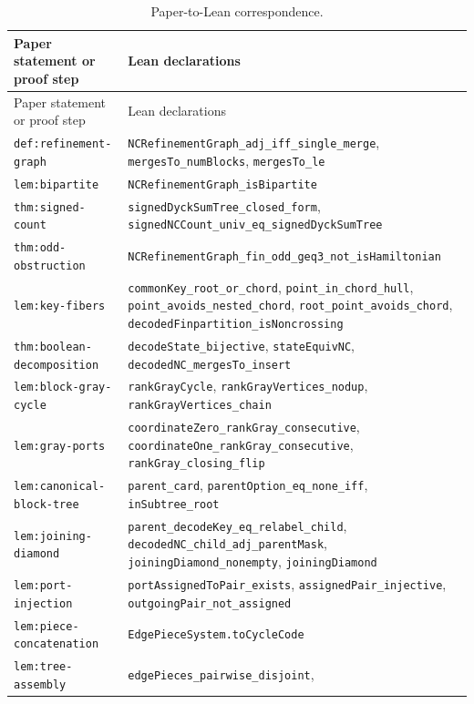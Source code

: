 \documentclass[12pt]{article}
\newcommand{\leanname}[1]{\nolinkurl{#1}}
\begin{document}
\begingroup\footnotesize
\begin{longtable}{p{}p{}}
\caption{Paper-to-Lean correspondence.}\label{tab:lean-map}\\
\toprule
Paper statement or proof step & Lean declarations\\
\midrule
\endfirsthead
\toprule
Paper statement or proof step & Lean declarations\\
\midrule
\endhead
\leanname{def:refinement-graph} &
\leanname{NCRefinementGraph_adj_iff_single_merge},
\leanname{mergesTo_numBlocks}, \leanname{mergesTo_le}\\
\leanname{lem:bipartite} &
\leanname{NCRefinementGraph_isBipartite}\\
\leanname{thm:signed-count} &
\leanname{signedDyckSumTree_closed_form},
\leanname{signedNCCount_univ_eq_signedDyckSumTree}\\
\leanname{thm:odd-obstruction} &
\leanname{NCRefinementGraph_fin_odd_geq3_not_isHamiltonian}\\
\leanname{lem:key-fibers} &
\leanname{commonKey_root_or_chord}, \leanname{point_in_chord_hull},
\leanname{point_avoids_nested_chord}, \leanname{root_point_avoids_chord},
\leanname{decodedFinpartition_isNoncrossing}\\
\leanname{thm:boolean-decomposition} &
\leanname{decodeState_bijective}, \leanname{stateEquivNC},
\leanname{decodedNC_mergesTo_insert}\\
\leanname{lem:block-gray-cycle} &
\leanname{rankGrayCycle}, \leanname{rankGrayVertices_nodup},
\leanname{rankGrayVertices_chain}\\
\leanname{lem:gray-ports} &
\leanname{coordinateZero_rankGray_consecutive},
\leanname{coordinateOne_rankGray_consecutive},
\leanname{rankGray_closing_flip}\\
\leanname{lem:canonical-block-tree} &
\leanname{parent_card}, \leanname{parentOption_eq_none_iff},
\leanname{inSubtree_root}\\
\leanname{lem:joining-diamond} &
\leanname{parent_decodeKey_eq_relabel_child},
\leanname{decodedNC_child_adj_parentMask},
\leanname{joiningDiamond_nonempty}, \leanname{joiningDiamond}\\
\leanname{lem:port-injection} &
\leanname{portAssignedToPair_exists}, \leanname{assignedPair_injective},
\leanname{outgoingPair_not_assigned}\\
\leanname{lem:piece-concatenation} &
\leanname{EdgePieceSystem.toCycleCode}\\
\leanname{lem:tree-assembly} &
\leanname{edgePieces_pairwise_disjoint},

\end{longtable}
\end{document}
